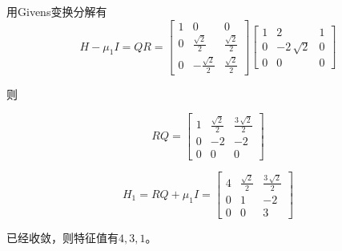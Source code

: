 \documentclass[UTF8,zihao=5]{ctexart}
\begin{document}
用Givens变换分解有
$$
H-\mu_1 I=QR
=
\left[\begin{array}{ccc} 1 & 0 & 0\\ 0 & \frac{\sqrt{2}}{2} & \frac{\sqrt{2}}{2}\\ 0 & -\frac{\sqrt{2}}{2} & \frac{\sqrt{2}}{2} \end{array}\right]
\left[\begin{array}{ccc} 1 & 2 & 1\\ 0 & -2\,\sqrt{2} & 0\\ 0 & 0 & 0 \end{array}\right]
$$

则

$$
RQ=\left[\begin{array}{ccc} 1 & \frac{\sqrt{2}}{2} & \frac{3\,\sqrt{2}}{2}\\ 0 & -2 & -2\\ 0 & 0 & 0 \end{array}\right]
$$

$$
H_1=RQ+\mu_1 I=
\left[\begin{array}{ccc} 4 & \frac{\sqrt{2}}{2} & \frac{3\,\sqrt{2}}{2}\\ 0 & 1 & -2\\ 0 & 0 & 3 \end{array}\right]
$$

已经收敛，则特征值有$4,3,1$。
\end{document}
